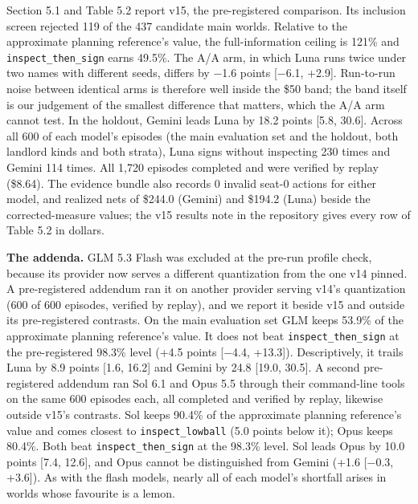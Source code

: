 Section 5.1 and Table 5.2 report v15, the pre-registered comparison. Its inclusion screen rejected 119 of the 437
candidate main worlds. Relative to the approximate planning reference's value, the full-information ceiling is 121\% and
\texttt{inspect\_\allowbreak{}then\_\allowbreak{}sign} earns 49.5\%. The A/A arm, in which Luna runs twice under two names with different seeds, differs by
−1.6 points {[}−6.1, +2.9{]}. Run-to-run noise between identical arms is therefore well inside the \$50 band; the band
itself is our judgement of the smallest difference that matters, which the A/A arm cannot test. In the holdout, Gemini
leads Luna by 18.2 points {[}5.8, 30.6{]}. Across all 600 of each model's episodes (the main evaluation set and the holdout, both
landlord kinds and both strata), Luna signs without inspecting 230 times and Gemini 114 times. All 1,720 episodes completed and were verified by
replay (\$8.64). The evidence bundle also records 0 invalid seat-0 actions for either model, and realized nets of
\$244.0 (Gemini) and \$194.2 (Luna) beside the corrected-measure values; the v15 results note in the repository gives
every row of Table 5.2 in dollars.

\textbf{The addenda.} GLM 5.3 Flash was excluded at the pre-run profile check, because its provider now serves a different
quantization from the one v14 pinned. A pre-registered addendum ran it on another provider serving v14's quantization
(600 of 600 episodes, verified by replay), and we report it beside v15 and outside its pre-registered contrasts. On
the main evaluation set GLM keeps 53.9\% of the approximate planning reference's value. It does not beat \texttt{inspect\_\allowbreak{}then\_\allowbreak{}sign} at
the pre-registered 98.3\% level (+4.5 points {[}−4.4, +13.3{]}). Descriptively, it trails Luna by 8.9 points {[}1.6, 16.2{]}
and Gemini by 24.8 {[}19.0, 30.5{]}. A second pre-registered addendum ran Sol 6.1 and Opus 5.5 through their command-line
tools on the same 600 episodes each, all completed and verified by replay, likewise outside v15's contrasts. Sol keeps
90.4\% of the approximate planning reference's value and comes closest to \texttt{inspect\_\allowbreak{}lowball} (5.0 points below it); Opus keeps
80.4\%. Both beat \texttt{inspect\_\allowbreak{}then\_\allowbreak{}sign} at the 98.3\% level. Sol leads Opus by 10.0 points {[}7.4, 12.6{]}, and Opus cannot be
distinguished from Gemini (+1.6 {[}−0.3, +3.6{]}). As with the flash models, nearly all of each model's shortfall arises
in worlds whose favourite is a lemon.


